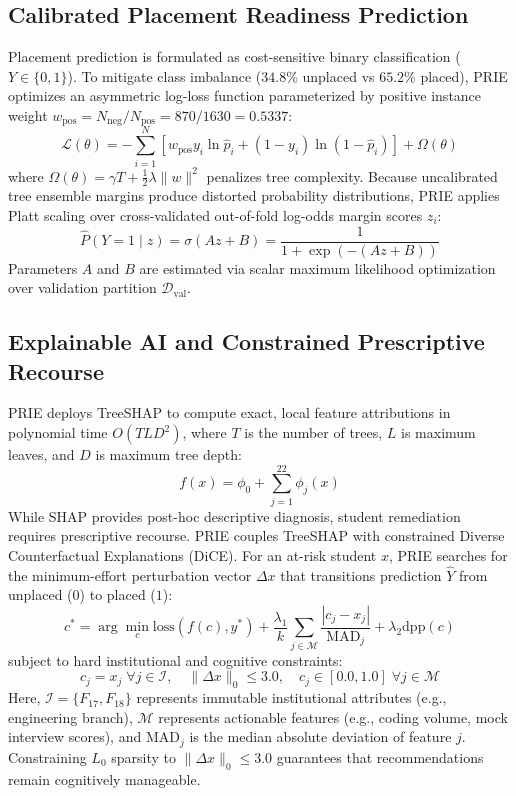 \documentclass[conference]{IEEEtran}
\begin{document}
\subsection{Calibrated Placement Readiness Prediction}
Placement prediction is formulated as cost-sensitive binary classification ($Y \in \{0, 1\}$). To mitigate class imbalance ($34.8\%$ unplaced vs $65.2\%$ placed), PRIE optimizes an asymmetric log-loss function parameterized by positive instance weight $w_{\text{pos}} = N_{\text{neg}} / N_{\text{pos}} = 870 / 1630 = 0.5337$:
\begin{equation}
\mathcal{L}(\theta) = -\sum_{i=1}^{N} \left[ w_{\text{pos}} y_i \ln \hat{p}_i + (1 - y_i) \ln (1 - \hat{p}_i) \right] + \Omega(\theta)
\end{equation}
where $\Omega(\theta) = \gamma T + \frac{1}{2} \lambda \|w\|^2$ penalizes tree complexity. Because uncalibrated tree ensemble margins produce distorted probability distributions, PRIE applies Platt scaling over cross-validated out-of-fold log-odds margin scores $z_i$:
\begin{equation}
\hat{P}(Y=1 \mid z) = \sigma(A z + B) = \frac{1}{1 + \exp(-(A z + B))}
\label{eq_platt}
\end{equation}
Parameters $A$ and $B$ are estimated via scalar maximum likelihood optimization over validation partition $\mathcal{D}_{\text{val}}$.

\subsection{Explainable AI and Constrained Prescriptive Recourse}
PRIE deploys TreeSHAP to compute exact, local feature attributions in polynomial time $O(T L D^2)$, where $T$ is the number of trees, $L$ is maximum leaves, and $D$ is maximum tree depth:
\begin{equation}
f(x) = \phi_0 + \sum_{j=1}^{22} \phi_j(x)
\end{equation}
While SHAP provides post-hoc descriptive diagnosis, student remediation requires prescriptive recourse. PRIE couples TreeSHAP with constrained Diverse Counterfactual Explanations (DiCE). For an at-risk student $x$, PRIE searches for the minimum-effort perturbation vector $\Delta x$ that transitions prediction $\hat{Y}$ from unplaced ($0$) to placed ($1$):
\begin{equation}
c^* = \arg\min_{c} \text{loss}(f(c), y^*) + \frac{\lambda_1}{k} \sum_{j \in \mathcal{M}} \frac{|c_j - x_j|}{\text{MAD}_j} + \lambda_2 \text{dpp}(c)
\label{eq_dice}
\end{equation}
subject to hard institutional and cognitive constraints:
\begin{equation}
c_j = x_j \; \forall j \in \mathcal{I}, \quad \|\Delta x\|_0 \le 3.0, \quad c_j \in [0.0, 1.0] \; \forall j \in \mathcal{M}
\end{equation}
Here, $\mathcal{I} = \{F_{17}, F_{18}\}$ represents immutable institutional attributes (e.g., engineering branch), $\mathcal{M}$ represents actionable features (e.g., coding volume, mock interview scores), and $\text{MAD}_j$ is the median absolute deviation of feature $j$. Constraining $L_0$ sparsity to $\|\Delta x\|_0 \le 3.0$ guarantees that recommendations remain cognitively manageable.
\end{document}
